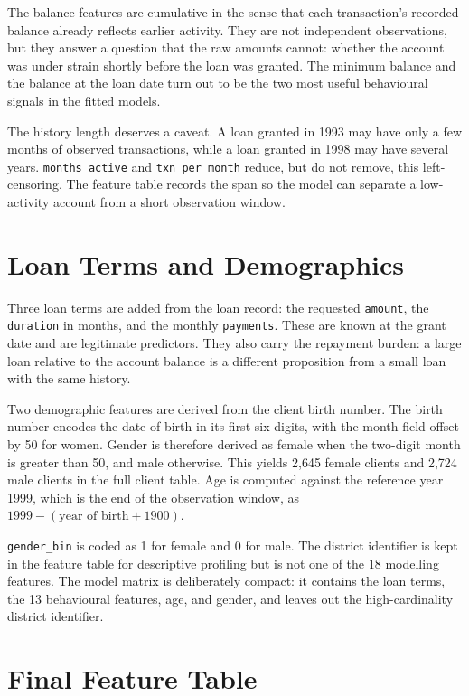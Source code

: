 The balance features are cumulative in the sense that each transaction's recorded balance already reflects earlier activity. They are not independent observations, but they answer a question that the raw amounts cannot: whether the account was under strain shortly before the loan was granted. The minimum balance and the balance at the loan date turn out to be the two most useful behavioural signals in the fitted models.

The history length deserves a caveat. A loan granted in 1993 may have only a few months of observed transactions, while a loan granted in 1998 may have several years. \texttt{months\_active} and \texttt{txn\_per\_month} reduce, but do not remove, this left-censoring. The feature table records the span so the model can separate a low-activity account from a short observation window.

\section{Loan Terms and Demographics}
\label{sec:terms-demographics}

Three loan terms are added from the loan record: the requested \texttt{amount}, the \texttt{duration} in months, and the monthly \texttt{payments}. These are known at the grant date and are legitimate predictors. They also carry the repayment burden: a large loan relative to the account balance is a different proposition from a small loan with the same history.

Two demographic features are derived from the client birth number. The birth number encodes the date of birth in its first six digits, with the month field offset by 50 for women. Gender is therefore derived as female when the two-digit month is greater than 50, and male otherwise. This yields 2,645 female clients and 2,724 male clients in the full client table. Age is computed against the reference year 1999, which is the end of the observation window, as $1999 - (\text{year of birth} + 1900)$.

\texttt{gender\_bin} is coded as 1 for female and 0 for male. The district identifier is kept in the feature table for descriptive profiling but is not one of the 18 modelling features. The model matrix is deliberately compact: it contains the loan terms, the 13 behavioural features, age, and gender, and leaves out the high-cardinality district identifier.

\section{Final Feature Table}
\label{sec:final-feature-table}

